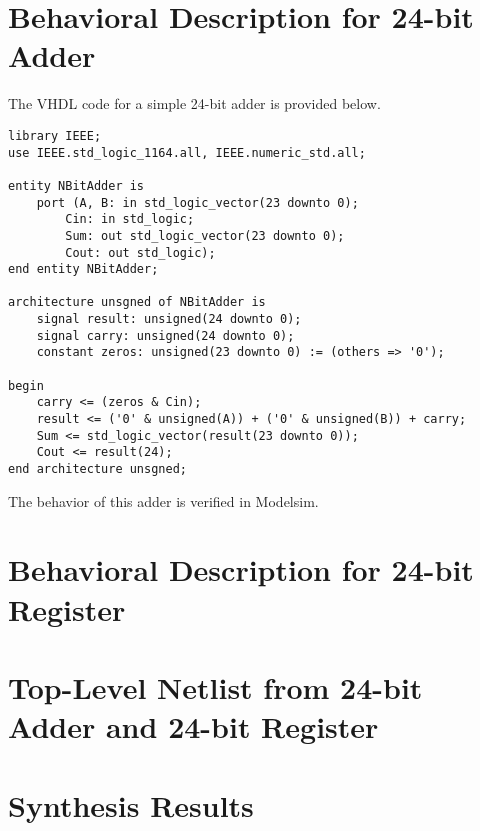 \documentclass[11pt,a4paper]{article}
\begin{document}
\section{Behavioral Description for 24-bit Adder}

The VHDL code for a simple 24-bit adder is provided below.\\ 

\begin{lstlisting}
library IEEE;
use IEEE.std_logic_1164.all, IEEE.numeric_std.all;

entity NBitAdder is
    port (A, B: in std_logic_vector(23 downto 0);
        Cin: in std_logic;
        Sum: out std_logic_vector(23 downto 0);
        Cout: out std_logic);
end entity NBitAdder;

architecture unsgned of NBitAdder is
    signal result: unsigned(24 downto 0);
    signal carry: unsigned(24 downto 0);
    constant zeros: unsigned(23 downto 0) := (others => '0');

begin
    carry <= (zeros & Cin);
    result <= ('0' & unsigned(A)) + ('0' & unsigned(B)) + carry;
    Sum <= std_logic_vector(result(23 downto 0));
    Cout <= result(24);
end architecture unsgned;
\end{lstlisting}


The behavior of this adder is verified in Modelsim. 

\section{Behavioral Description for 24-bit Register}


\section{Top-Level Netlist from 24-bit Adder and 24-bit Register}

 
\section{Synthesis Results}
\end{document}
